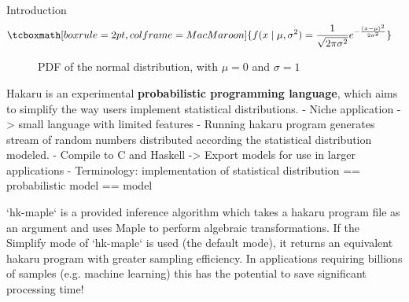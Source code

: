 \documentclass[22pt]{beamer}
\begin{document}
\begin{frame}[fragile]
\begin{textblock}{5}
\begin{block}{Introduction}
\begin{equation*}
\begin{aligned}
& \tcboxmath[boxrule=2pt,colframe=MacMaroon]{f(x \mid \mu, \sigma^2) = \frac{1}{\sqrt{2\pi\sigma^2}} e^{-\frac{(x - \mu)^2}{2\sigma^2}}}
\end{aligned}
\end{equation*}

\begin{figure}
\caption{\tiny{PDF of the normal distribution, with $\mu = 0$ and $\sigma = 1$}}
\end{figure}

\tiny{Hakaru is an experimental \textbf{probabilistic programming language}, which aims to simplify the way users implement statistical distributions. 
  - Niche application -> small language with limited features
  - Running hakaru program generates stream of random numbers distributed according the statistical distribution modeled.
  - Compile to C and Haskell -> Export models for use in larger applications
  - Terminology: implementation of statistical distribution == probabilistic model == model
}

\bigskip

\tiny{`hk-maple` is a provided inference algorithm which takes a hakaru program file as an argument and uses Maple to perform algebraic transformations. If the Simplify mode of `hk-maple` is used (the default mode), it returns an equivalent hakaru program with greater sampling efficiency. In applications requiring billions of samples (e.g. machine learning) this has the potential to save significant processing time!}

\end{block}



\end{textblock}
\end{frame}
\end{document}

